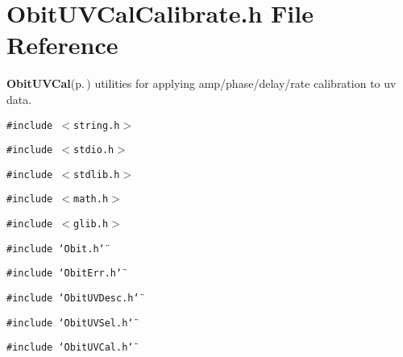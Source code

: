 \section{Obit\-UVCal\-Calibrate.h File Reference}
\label{ObitUVCalCalibrate_8h}
{\bf Obit\-UVCal}{\rm (p.\,\pageref{structObitUVCal})} utilities for applying amp/phase/delay/rate calibration to uv data. 

{\tt \#include $<$string.h$>$}\par
{\tt \#include $<$stdio.h$>$}\par
{\tt \#include $<$stdlib.h$>$}\par
{\tt \#include $<$math.h$>$}\par
{\tt \#include $<$glib.h$>$}\par
{\tt \#include \char`\"{}Obit.h\char`\"{}}\par
{\tt \#include \char`\"{}Obit\-Err.h\char`\"{}}\par
{\tt \#include \char`\"{}Obit\-UVDesc.h\char`\"{}}\par
{\tt \#include \char`\"{}Obit\-UVSel.h\char`\"{}}\par
{\tt \#include \char`\"{}Obit\-UVCal.h\char`\"{}}\par
